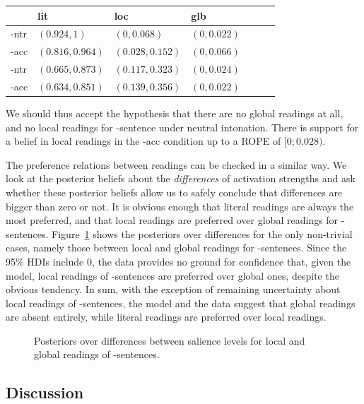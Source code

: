 \documentclass[fleqn,reqno,10pt,draft]{article}
\newcommand{\as}{\acro{as}}
\renewcommand{\es}{\acro{es}}
\begin{document}
\begin{center}
  \begin{tabular}{lllllll}
    & lit & loc & glb & \\ \midrule
    \as-ntr & $(0.924 , 1)$ & $(0 , 0.068)$
    & $(0 , 0.022)$ \\
    \as-acc 
    & $(0.816 , 0.964)$
    & $(0.028 , 0.152)$
    & $(0 , 0.066)$ \\
    \es-ntr 
    & $(0.665 , 0.873)$
    & $(0.117 , 0.323)$
    & $(0 , 0.024)$ \\
    \es-acc 
    & $(0.634 , 0.851)$
    & $(0.139 , 0.356)$
    & $(0 , 0.022)$ 
  \end{tabular}
\end{center}

\noindent We should thus accept the hypothesis that there are no
global readings at all, and no local readings for \as-sentence under
neutral intonation. There is support for a belief in local readings in
the \as-acc condition up to a ROPE of $[0;0.028)$.

The preference relations between readings can be checked in a similar
way. We look at the posterior beliefs about the \emph{differences} of
activation strengths and ask whether these posterior beliefs allow us
to safely conclude that differences are bigger than zero or not. It is
obvious enough that literal readings are always the most preferred,
and that local readings are preferred over global readings for
\es-sentences. Figure~\ref{fig:PostDiffTAS} shows the posteriors over
differences for the only non-trivial cases, namely those between local
and global readings for \as-sentences. Since the 95\% HDIs include 0,
the data provides no ground for confidence that, given the model,
local readings of \as-sentences are preferred over global ones,
despite the obvious tendency. In sum, with the exception of remaining
uncertainty about local readings of \as-sentences, the model and the
data suggest that global readings are absent entirely, while literal
readings are preferred over local readings.

\begin{figure}
  \centering
  \hfill
  \caption{Posteriors over differences between salience levels for
    local and global readings of \as-sentences.}
  \label{fig:PostDiffTAS}
\end{figure}

\subsection{Discussion}
\label{sec:discussion-1}
\end{document}
